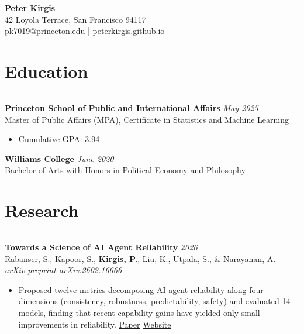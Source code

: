\documentclass[11pt]{article}
\begin{document}
\vspace*{-1.8cm}

\begin{center}
    {\LARGE \textbf{Peter Kirgis}}\\
    \vspace{1mm}
    42 Loyola Terrace, San Francisco 94117 \\[-2pt]
    \href{mailto:pk7019@princeton.edu}{pk7019@princeton.edu} \;|\; \href{https://peterkirgis.github.io}{\underline{peterkirgis.github.io}}
\end{center}

\section*{Education}
\hrule
\vspace{1em}
\textbf{Princeton School of Public and International Affairs} \hfill \textit{May 2025}\\
Master of Public Affairs (MPA), Certificate in Statistics and Machine Learning
\begin{itemize}
    \item Cumulative GPA: 3.94
\end{itemize}

\vspace{0.4em}
\textbf{Williams College} \hfill \textit{June 2020}\\
Bachelor of Arts with Honors in Political Economy and Philosophy

\vspace{1em}

\section*{Research}
\hrule
\vspace{1em}

\textbf{Towards a Science of AI Agent Reliability} \hfill \textit{2026}\\
Rabanser, S., Kapoor, S., \textbf{Kirgis, P.}, Liu, K., Utpala, S., \& Narayanan, A.\\
\textit{arXiv preprint arXiv:2602.16666}
\begin{itemize}
    \item Proposed twelve metrics decomposing AI agent reliability along four dimensions (consistency, robustness, predictability, safety) and evaluated 14 models, finding that recent capability gains have yielded only small improvements in reliability.
    \hfill \href{https://arxiv.org/pdf/2602.16666}{\underline{Paper}} \quad\textbar\quad \href{https://hal.cs.princeton.edu/reliability/}{\underline{Website}}
\end{itemize}
\end{document}

